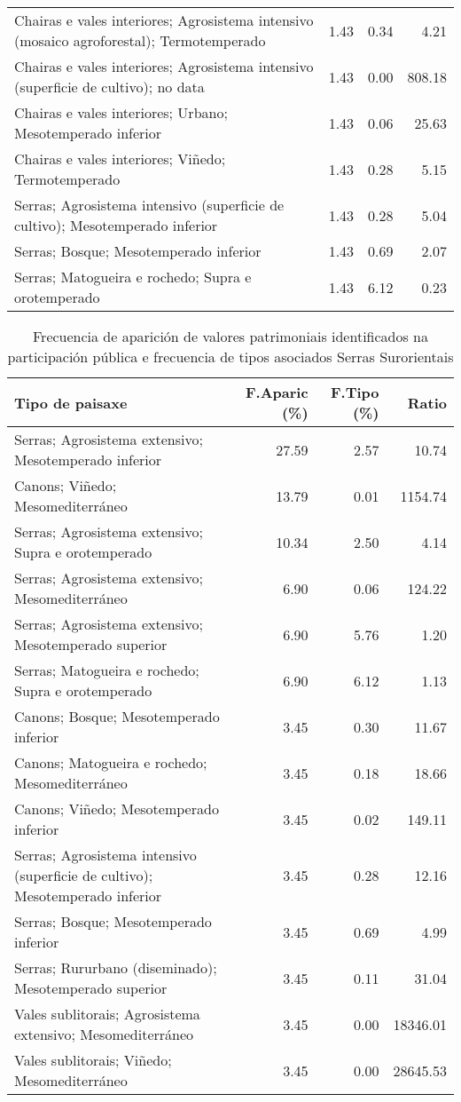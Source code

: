 \begin{table}[p]
\begin{tabular}{lrrr}
  Chairas e vales interiores; Agrosistema intensivo (mosaico agroforestal); Termotemperado & 1.43 & 0.34 & 4.21 \\ 
  Chairas e vales interiores; Agrosistema intensivo (superficie de cultivo); no data & 1.43 & 0.00 & 808.18 \\ 
  Chairas e vales interiores; Urbano; Mesotemperado inferior & 1.43 & 0.06 & 25.63 \\ 
  Chairas e vales interiores; Viñedo; Termotemperado & 1.43 & 0.28 & 5.15 \\ 
  Serras; Agrosistema intensivo (superficie de cultivo); Mesotemperado inferior & 1.43 & 0.28 & 5.04 \\ 
  Serras; Bosque; Mesotemperado inferior & 1.43 & 0.69 & 2.07 \\ 
  Serras; Matogueira e rochedo; Supra e orotemperado & 1.43 & 6.12 & 0.23 \\ 
   \hline
\end{tabular}
\end{table}
\begin{table}[p]
\centering
\caption{Frecuencia de aparición de valores patrimoniais identificados na participación pública e frecuencia de tipos asociados Serras Surorientais} 
\label{vsixotpat9}
\begin{tabular}{lrrr}
  \hline
Tipo de paisaxe & F.Aparic (\%) & F.Tipo (\%) & Ratio \\ 
  \hline
Serras; Agrosistema extensivo; Mesotemperado inferior & 27.59 & 2.57 & 10.74 \\ 
  Canons; Viñedo; Mesomediterráneo & 13.79 & 0.01 & 1154.74 \\ 
  Serras; Agrosistema extensivo; Supra e orotemperado & 10.34 & 2.50 & 4.14 \\ 
  Serras; Agrosistema extensivo; Mesomediterráneo & 6.90 & 0.06 & 124.22 \\ 
  Serras; Agrosistema extensivo; Mesotemperado superior & 6.90 & 5.76 & 1.20 \\ 
  Serras; Matogueira e rochedo; Supra e orotemperado & 6.90 & 6.12 & 1.13 \\ 
  Canons; Bosque; Mesotemperado inferior & 3.45 & 0.30 & 11.67 \\ 
  Canons; Matogueira e rochedo; Mesomediterráneo & 3.45 & 0.18 & 18.66 \\ 
  Canons; Viñedo; Mesotemperado inferior & 3.45 & 0.02 & 149.11 \\ 
  Serras; Agrosistema intensivo (superficie de cultivo); Mesotemperado inferior & 3.45 & 0.28 & 12.16 \\ 
  Serras; Bosque; Mesotemperado inferior & 3.45 & 0.69 & 4.99 \\ 
  Serras; Rururbano (diseminado); Mesotemperado superior & 3.45 & 0.11 & 31.04 \\ 
  Vales sublitorais; Agrosistema extensivo; Mesomediterráneo & 3.45 & 0.00 & 18346.01 \\ 
  Vales sublitorais; Viñedo; Mesomediterráneo & 3.45 & 0.00 & 28645.53 \\ 
   \hline
\end{tabular}
\end{table}

